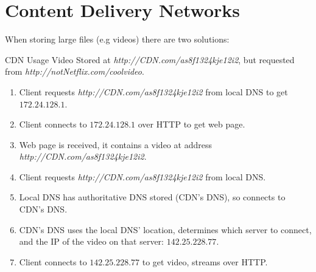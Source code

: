 \section{Content Delivery Networks}
When storing large files (e.g videos) there are two solutions:
\\ 
\begin{examplebox}{CDN Usage}
    Video Stored at \textit{http://CDN.com/as8f1324kje12i2}, but requested from \textit{http://notNetflix.com/coolvideo}.
    \begin{enumerate}
        \setlength\itemsep{0em}
        \item Client requests \textit{http://CDN.com/as8f1324kje12i2} from local DNS to get $172.24.128.1$.
        \item Client connects to $172.24.128.1$ over HTTP to get web page.
        \item Web page is received, it contains a video at address \textit{http://CDN.com/as8f1324kje12i2}.
        \item Client requests \textit{http://CDN.com/as8f1324kje12i2} from local DNS.
        \item Local DNS has authoritative DNS stored (CDN's DNS), so connects to CDN's DNS.
        \item CDN's DNS uses the local DNS' location, determines which server to connect, and the IP of the video on that server: $142.25.228.77$.
        \item Client connects to $142.25.228.77$ to get video, streams over HTTP.
    \end{enumerate}
\end{examplebox}

